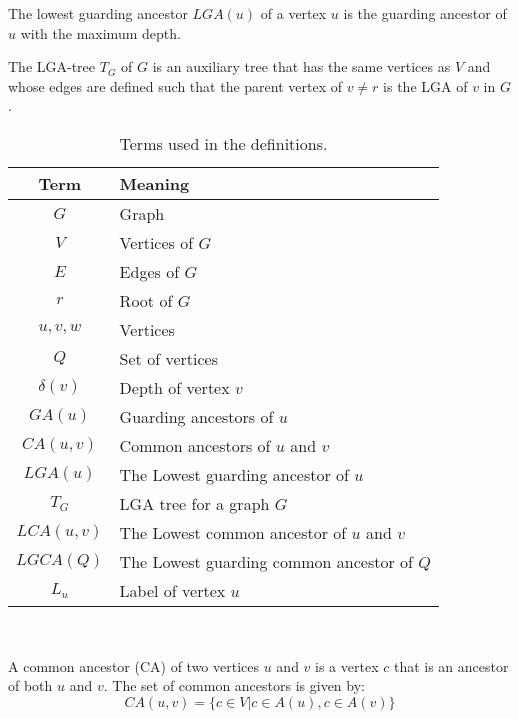 \begin{definition}
	The lowest guarding ancestor $LGA(u)$ of a vertex $u$ is the guarding ancestor of $u$ with the maximum depth.
\end{definition}

\begin{definition}
	The LGA-tree $T_G$ of $G$  is an auxiliary tree that has the same vertices as $V$ and whose edges are defined such that the parent vertex of $v \neq r$ is the LGA of $v$ in $G$.
\end{definition}

\begin{table}[ht]
    \centering
	\captionsetup{justification=centering}
	\begin{tabular}{c l}
		\textbf{Term} & \textbf{Meaning} \\
		\hline 
		$G$ & Graph \\
		$V$ & Vertices of $G$\\
		$E$ & Edges of $G$\\
		$r$ & Root of $G$\\
		$u, v, w$& Vertices \\
		$Q$ & Set of vertices\\
		$\delta(v)$ & Depth of vertex $v$\\
		$GA(u)$ & Guarding ancestors of $u$\\
		$CA(u,v)$ & Common ancestors of $u$ and $v$\\
		$LGA(u)$ & The Lowest guarding ancestor of $u$\\
		$T_G$ & LGA tree for a graph $G$\\
		$LCA(u,v)$ & The Lowest common ancestor of $u$ and $v$\\
		$LGCA(Q)$ & The Lowest guarding common ancestor of $Q$\\
		$L_u$ & Label of vertex $u$\\
	\end{tabular}\\
	\caption{Terms used in the definitions.}
	\label{definitionsLegend}
\end{table}

\begin{definition} \label{def:commonAncestor}
	A common ancestor (CA) of two vertices $u$ and $v$ is a vertex $c$ that is an ancestor of both $u$ and $v$.
	The set of common ancestors is given by:
	\begin{equation*}
		\mathit{CA}(u,v) =	\{c \in V | c \in A(u) , c \in A(v)\}
	\end{equation*}
\end{definition}

